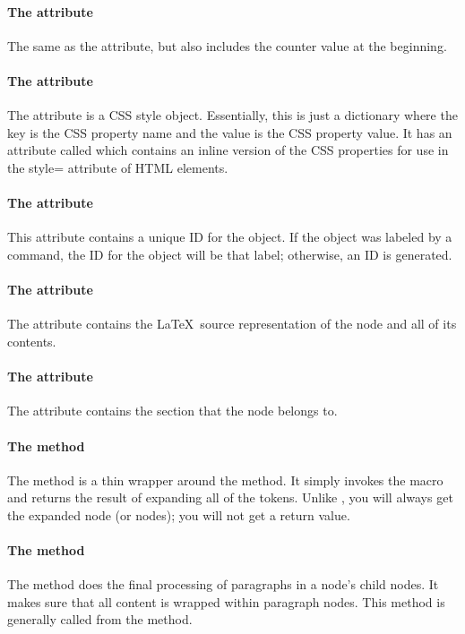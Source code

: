\paragraph{The  attribute}
The same as the  attribute, but also includes the
counter value at the beginning.

\paragraph{The  attribute}
The  attribute is a CSS style object.  Essentially, this is
just a dictionary where the key is the CSS property name and the value
is the CSS property value.  It has an attribute called 
which contains an inline version of the CSS properties for use
in the style= attribute of HTML elements.

\paragraph{The  attribute}
This attribute contains a unique ID for the object.  If the object
was labeled by a  command, the ID for the object will
be that label; otherwise, an ID is generated.

\paragraph{The  attribute}
The  attribute contains the \LaTeX\ source representation
of the node and all of its contents.

\paragraph{The  attribute}
The  attribute contains the section that the
node belongs to.

\paragraph{The  method}
The  method is a thin wrapper around the 
method.  It simply invokes the macro and returns the result of
expanding all of the tokens.  Unlike , you will
always get the expanded node (or nodes); you will not get a 
return value.

\paragraph{The  method}
The  method does the final processing of paragraphs
in a node's child nodes.  It makes sure that all content is wrapped
within paragraph nodes.  This method is generally called from the
 method.


